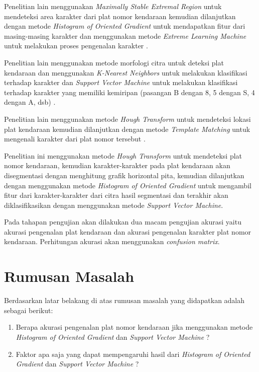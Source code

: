 \noindent Penelitian lain menggunakan \textit{Maximally Stable Extremal Region} untuk mendeteksi area karakter dari plat nomor kendaraan kemudian dilanjutkan dengan metode \textit{Histogram of Oriented Gradient} untuk mendapatkan fitur dari masing-masing karakter dan menggunakan metode \textit{Extreme Learning Machine} untuk melakukan proses pengenalan karakter \cite{gou2014}.

\noindent Penelitian lain menggunakan metode morfologi citra untuk deteksi plat kendaraan dan menggunakan \textit{K-Nearest Neighbors} untuk melakukan klasifikasi terhadap karakter dan \textit{Support Vector Machine} untuk melakukan klasifikasi terhadap karakter yang memiliki kemiripan (pasangan B dengan 8, 5 dengan S, 4 dengan A, dsb) \cite{tabrizi}.

\noindent Penelitian lain menggunakan metode \textit{Hough Transform} untuk mendeteksi lokasi plat kendaraan kemudian dilanjutkan dengan metode \textit{Template Matching} untuk mengenali karakter dari plat nomor tersebut \cite{rasheed}. 

\noindent Penelitian ini menggunakan metode  \textit{Hough Transform} untuk mendeteksi plat nomor kendaraan, kemudian karakter-karakter pada plat kendaraan akan disegmentasi dengan menghitung grafik horizontal pita, kemudian dilanjutkan dengan menggunakan metode \textit{Histogram of Oriented Gradient} untuk mengambil fitur dari karakter-karakter dari citra hasil segmentasi dan terakhir akan diklasifikasikan dengan menggunakan metode \textit{Support Vector Machine}.

\noindent Pada tahapan pengujian akan dilakukan dua macam pengujian akurasi yaitu akurasi pengenalan plat kendaraan dan akurasi pengenalan karakter plat nomor kendaraan. Perhitungan akurasi akan menggunakan \textit{confusion matrix}.\\

\section{Rumusan Masalah}
\noindent Berdasarkan latar belakang di atas rumusan masalah yang didapatkan adalah sebagai berikut:
\begin{enumerate}[nolistsep,leftmargin=0.5cm]
\item Berapa akurasi pengenalan plat nomor kendaraan jika menggunakan metode \textit{Histogram of Oriented Gradient} dan \textit{Support Vector Machine} ?
\item Faktor apa saja yang dapat mempengaruhi hasil dari \textit{Histogram of Oriented Gradient} dan \textit{Support Vector Machine} ? \\
\end{enumerate}

